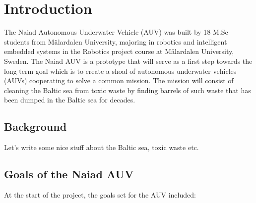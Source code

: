 
\section{Introduction}\label{sec:introduction}
The Naiad Autonomous Underwater Vehicle (AUV) was built by 18 M.Sc students from M\"{a}lardalen University, majoring in robotics and intelligent embedded systems in the Robotics project course at  M\"{a}lardalen University, Sweden. \newline
The Naiad AUV is a prototype that will serve as a first step towards the long term goal which is to create a shoal of autonomous underwater vehicles (AUVs) cooperating to solve a common mission. The mission will consist of cleaning the Baltic sea from toxic waste by finding barrels of such waste that has been dumped in the Baltic sea for decades. \newline



\subsection{Background}
Let's write some nice stuff about the Baltic sea, toxic waste etc.

\subsection{Goals of the Naiad AUV}
At the start of the project, the goals set for the AUV included: %

